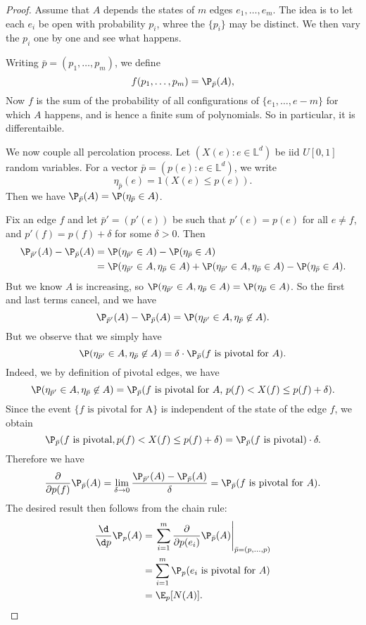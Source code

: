 \documentclass[a4paper]{article}
\renewcommand\L{\mathbb{L}}
\begin{document}
\begin{proof}
  Assume that $A$ depends the states of $m$ edges $e_1, \ldots, e_m$. The idea is to let each $e_i$ be open with probability $p_i$, whree the $\{p_i\}$ may be distinct. We then vary the $p_i$ one by one and see what happens.

  Writing $\bar{p} = (p_1, \ldots, p_m)$, we define
  \[
    f(p_1, \ldots, p_m) = \P_{\bar{p}} (A),
  \]
  Now $f$ is the sum of the probability of all configurations of $\{e_1, \ldots, e-m\}$ for which $A$ happens, and is hence a finite sum of polynomials. So in particular, it is differentaible.

  We now couple all percolation process. Let $(X(e): e \in \L^d)$ be iid $U[0, 1]$ random variables. For a vector $\bar{p} = (p(e): e \in \L^d)$, we write
  \[
    \eta_{\bar{p}}(e) = 1 (X(e) \leq p(e)).
  \]
  Then we have $\P_{\bar{p}}(A) = \P(\eta_{\bar{p}} \in A)$.

  Fix an edge $f$ and let $\bar{p}' = (p'(e))$ be such that $p'(e) = p(e)$ for all $e \not= f$, and $p'(f) = p(f) + \delta$ for some $\delta > 0$. Then
  \begin{align*}
    \P_{\bar{p}'}(A) - \P_{\bar{p}}(A) &= \P(\eta_{\bar{p}'} \in A) - \P(\eta_{\bar{p}} \in A)\\
    &= \P(\eta_{\bar{p}'} \in A, \eta_{\bar{p}} \in A) + \P(\eta_{\bar{p}'} \in A, \eta_{\bar{p}} \in A) - \P(\eta_{\bar{p}} \in A).
  \end{align*}
  But we know $A$ is increasing, so $\P(\eta_{\bar{p}'} \in A, \eta_{\bar{p}} \in A) = \P(\eta_{\bar{p}} \in A)$. So the first and last terms cancel, and we have
  \[
    \P_{\bar{p}'}(A) - \P_{\bar{p}}(A) = \P(\eta_{\bar{p}'} \in A, \eta_{\bar{p}} \not \in A).
  \]
  But we observe that we simply have
  \[
    \P (\eta_{\bar{p}'} \in A, \eta_{\bar{p}} \not \in A) = \delta \cdot \P_{\bar{p}} (f \text{ is pivotal for $A$}).
  \]
  Indeed, we by definition of pivotal edges, we have
  \[
    \P(\eta_{\bar{p}'} \in A, \eta_{\bar{p}} \not \in A) = \P_{\bar{p}}(f \text{ is pivotal for $A$, }p(f) < X(f) \leq p(f) + \delta).
  \]
  Since the event $\{f \text{ is pivotal for A}\}$ is independent of the state of the edge $f$, we obtain
  \[
    \P_{\bar{p}}(f\text{ is pivotal}, p(f) < X(f) \leq p(f) + \delta) = \P_{\bar{p}}(f\text{ is pivotal}) \cdot \delta.
  \]
  Therefore we have
  \[
    \frac{\partial}{\partial p(f)} \P_{\bar{p}}(A) = \lim_{\delta \to 0} \frac{\P_{\bar{p}'}(A) - \P_{\bar{p}}(A)}{\delta} = \P_{\bar{p}}(\text{$f$ is pivotal for $A$}).
  \]
  The desired result then follows from the chain rule:
  \begin{align*}
    \frac{\d}{\d p} \P_p(A) &= \left.\sum_{i = 1}^m \frac{\partial}{\partial p(e_i)} \P_{\bar{p}}(A)\right|_{\bar{p} = (p, \ldots, p)} \\
    &= \sum_{i = 1}^m \P_p(\text{$e_i$ is pivotal for $A$})\\
    &= \E_p[N(A)].\qedhere
  \end{align*}
\end{proof}
\end{document}
